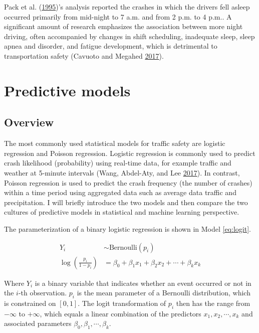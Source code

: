 \documentclass[12pt]{book}
\numberwithin{equation}{chapter}
\begin{document}
Pack et al. (\protect\hyperlink{ref-pack1995characteristics}{1995})'s analysis reported the crashes in which the drivers fell asleep occurred primarily from mid-night to 7 a.m. and from 2 p.m. to 4 p.m.. A significant amount of research emphasizes the association between more night driving, often accompanied by changes in shift scheduling, inadequate sleep, sleep apnea and disorder, and fatigue development, which is detrimental to transportation safety (Cavuoto and Megahed \protect\hyperlink{ref-cavuoto2017understanding}{2017}).

\hypertarget{predictive-models}{%
\section{Predictive models}\label{predictive-models}}

\hypertarget{overview}{%
\subsection{Overview}\label{overview}}

The most commonly used statistical models for traffic safety are logistic regression and Poisson regression. Logistic regression is commonly used to predict crash likelihood (probability) using real-time data, for example traffic and weather at 5-minute intervals (Wang, Abdel-Aty, and Lee \protect\hyperlink{ref-wang2017safety}{2017}). In contrast, Poisson regression is used to predict the crash frequency (the number of crashes) within a time period using aggregated data such as average data traffic and precipitation. I will briefly introduce the two models and then compare the two cultures of predictive models in statistical and machine learning perspective.

The parameterization of a binary logistic regression is shown in Model \eqref{eq:logit}.

\begin{equation}
\begin{split}
Y_i & \sim \text{Bernoulli}(p_i) \\
\log(\frac{p_i}{1 - p_i}) & = \beta_0 + \beta_1x_1 + \beta_2x_2 + \cdots + \beta_kx_k
\label{eq:logit}
\end{split}
\end{equation}

Where \(Y_i\) is a binary variable that indicates whether an event occurred or not in the \(i\)-th observation. \(p_i\) is the mean parameter of a Bernoulli distribution, which is constrained on \([0, 1]\). The logit transformation of \(p_i\) then has the range from \(-\infty\) to \(+\infty\), which equals a linear combination of the predictors \(x_1, x_2, \cdots, x_k\) and associated parameters \(\beta_0, \beta_1, \cdots, \beta_k\).
\end{document}

